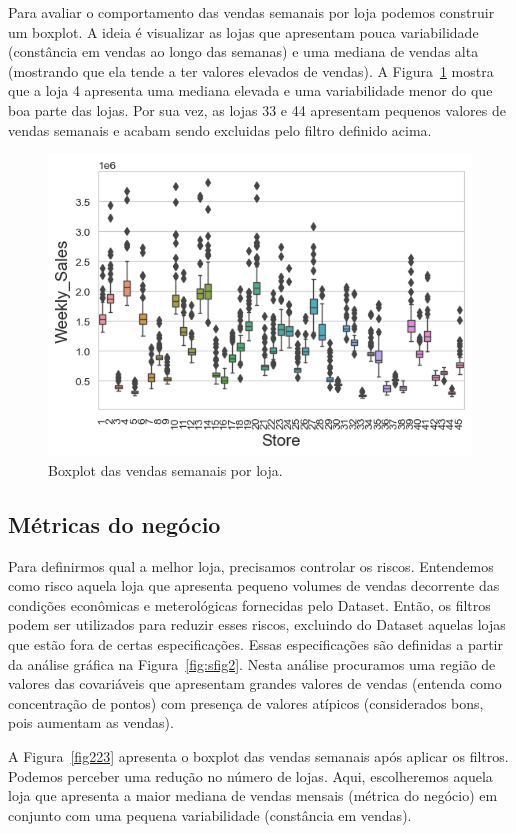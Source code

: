 \documentclass[letterpaper,11pt]{article}
\begin{document}
Para avaliar o comportamento das vendas semanais por loja podemos construir um boxplot. A ideia é visualizar as lojas que apresentam pouca variabilidade (constância em vendas ao longo das semanas) e uma mediana de vendas alta (mostrando que ela tende a ter  valores elevados de vendas). A Figura~\ref{fig22} mostra que a loja 4 apresenta uma mediana elevada e uma variabilidade menor do que boa parte das lojas. Por sua vez, as lojas 33 e 44 apresentam pequenos valores de vendas semanais e acabam sendo excluidas pelo filtro definido acima.

\begin{figure}[!htb] 
        \centering \includegraphics[width=0.5\columnwidth]{boxplot.png}
        \caption{\label{fig22}Boxplot das vendas semanais por loja.
        }
\end{figure}

\subsection{Métricas do negócio}

Para definirmos qual a melhor loja, precisamos controlar os riscos. Entendemos como risco aquela loja que apresenta pequeno volumes de vendas decorrente das condições econômicas e meterológicas fornecidas pelo Dataset. Então, os filtros podem ser utilizados para reduzir esses riscos, excluindo do Dataset aquelas lojas que estão fora de certas especificações. Essas especificações são definidas a partir da análise gráfica na Figura~\ref{fig:sfig2}. Nesta análise procuramos uma região de valores das covariáveis que apresentam grandes valores de vendas (entenda como concentração de pontos) com presença de valores atípicos (considerados bons, pois aumentam as vendas).

A Figura~\ref{fig223} apresenta o boxplot das vendas semanais após aplicar os filtros. Podemos perceber uma redução no número de lojas. Aqui, escolheremos aquela loja que apresenta a maior mediana de vendas mensais (métrica do negócio) em conjunto com uma pequena variabilidade (constância em vendas).
\end{document}
